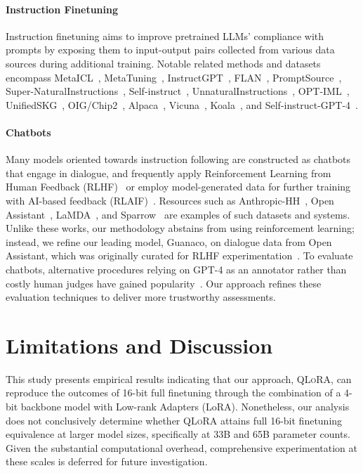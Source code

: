 \paragraph{Instruction Finetuning} Instruction finetuning aims to improve pretrained LLMs' compliance with prompts by exposing them to input-output pairs collected from various data sources during additional training. Notable related methods and datasets encompass MetaICL~\citep{min2021metaicl}, MetaTuning~\citep{zhong2021adapting}, InstructGPT~\citep{ouyang2022training}, FLAN~\citep{wei2021finetuned,chung2022scaling}, PromptSource~\citep{bach2022promptsource}, Super-NaturalInstructions~\citep{wang2022super,sanh2021multitask}, Self-instruct~\citep{wang2022self}, UnnaturalInstructions~\citep{honovich2022unnatural}, OPT-IML~\citep{iyer2022opt}, UnifiedSKG~\citep{xie2022unifiedskg}, OIG/Chip2~\citep{laion2023}, Alpaca~\citep{alpaca}, Vicuna~\citep{vicuna2023}, Koala~\citep{koala_blogpost_2023}, and Self-instruct-GPT-4~\citep{peng2023instruction}.

\paragraph{Chatbots} Many models oriented towards instruction following are constructed as chatbots that engage in dialogue, and frequently apply Reinforcement Learning from Human Feedback (RLHF)~\citep{christiano2017deep} or employ model-generated data for further training with AI-based feedback (RLAIF)~\citep{bai2022constitutional}. Resources such as Anthropic-HH~\citep{askell2021general,bai2022training}, Open Assistant~\citep{kopf2023openassistant}, LaMDA~\citep{thoppilan2022lamda}, and Sparrow~\citep{glaese2022improving} are examples of such datasets and systems. Unlike these works, our methodology abstains from using reinforcement learning; instead, we refine our leading model, Guanaco, on dialogue data from Open Assistant, which was originally curated for RLHF experimentation~\citep{kopf2023openassistant}. To evaluate chatbots, alternative procedures relying on GPT-4 as an annotator rather than costly human judges have gained popularity~\citep{vicuna2023,peng2023instruction}. Our approach refines these evaluation techniques to deliver more trustworthy assessments.

\section{Limitations and Discussion}

This study presents empirical results indicating that our approach, \textsc{QLoRA}, can reproduce the outcomes of 16-bit full finetuning through the combination of a 4-bit backbone model with Low-rank Adapters (LoRA). Nonetheless, our analysis does not conclusively determine whether \textsc{QLoRA} attains full 16-bit finetuning equivalence at larger model sizes, specifically at 33B and 65B parameter counts. Given the substantial computational overhead, comprehensive experimentation at these scales is deferred for future investigation.

